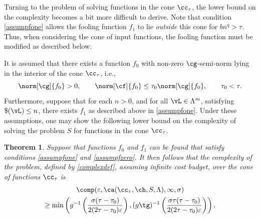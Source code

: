 \documentclass[]{elsarticle}
\newtheorem{theorem}{Theorem}
\theoremstyle{definition}
\theoremstyle{remark}
\begin{document}
Turning to the problem of solving functions in the cone $\cc_{\tau}$, the lower bound on the complexity becomes a bit more difficult to derive.  Note that condition \eqref{assumpfone} allows the fooling function $f_1$ to lie \emph{outside} this cone for $bn^q > \tau$.  Thus, when considering the cone of input functions, the fooling function must be modified as described below.

It is assumed that there exists a function $f_0$ with non-zero $\cg$-semi-norm lying in the interior of the cone $\cc_{\tau}$, i.e.,
\begin{equation}
\label{assumpfzero}
\norm[\cg]{f_{0}} > 0, \qquad \norm[\cf]{f_{0}} \le \tau_0 \norm[\cg]{f_{0}}, \qquad \tau_0 < \tau.
\end{equation}
Furthermore, suppose that for each $n>0$, and for all $\vL \in \Lambda^m$, satisfying $\$(\vL)\le n$, there exists $f_1$ as described above in \eqref{assumpfone}. Under these assumptions, one may show the following lower bound on the complexity of solving the problem $S$ for functions in the cone $\cc_{\tau}$.

\begin{theorem} \label{complowbd} Suppose that functions $f_{0}$ and $f_1$ can be found that satisfy conditions \eqref{assumpfone} and \eqref{assumpfzero}.  It then follows that the complexity of the problem, defined by \eqref{complexdef}, assuming infinite cost budget, over the cone of functions $\cc_{\tau}$ is
\begin{multline*}
\comp(\varepsilon,\ca(\cc_{\tau},\ch,S,\Lambda),\infty,\sigma) \\
\ge \min\left(g^{-1}\left(\frac{\sigma(\tau-\tau_0)}{2(2\tau-\tau_0)\varepsilon}\right), (g\tg)^{-1}\left(\frac{\sigma\tau(\tau-\tau_0)}{2(2\tau-\tau_0)\varepsilon}\right) \right).
\end{multline*}
\end{theorem}
\end{document}
